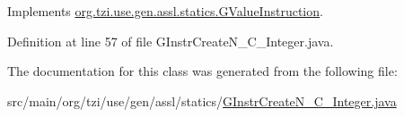 Implements \hyperlink{interfaceorg_1_1tzi_1_1use_1_1gen_1_1assl_1_1statics_1_1_g_value_instruction_a8fb7e593c2822d29ca840961f1f19df3}{org.\-tzi.\-use.\-gen.\-assl.\-statics.\-G\-Value\-Instruction}.



Definition at line 57 of file G\-Instr\-Create\-N\-\_\-\-C\-\_\-\-Integer.\-java.



The documentation for this class was generated from the following file\-:\begin{DoxyCompactItemize}
\item 
src/main/org/tzi/use/gen/assl/statics/\hyperlink{_g_instr_create_n___c___integer_8java}{G\-Instr\-Create\-N\-\_\-\-C\-\_\-\-Integer.\-java}\end{DoxyCompactItemize}
